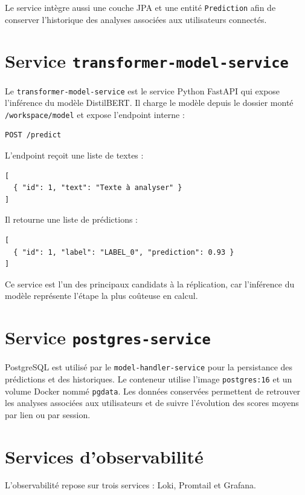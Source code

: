 ﻿\documentclass[12pt, a4paper]{report}
\begin{document}
Le service intègre aussi une couche JPA et une entité \texttt{Prediction} afin
de conserver l'historique des analyses associées aux utilisateurs connectés.

\section{Service \texttt{transformer-model-service}}

Le \texttt{transformer-model-service} est le service Python FastAPI qui expose
l'inférence du modèle DistilBERT. Il charge le modèle depuis le dossier monté
\texttt{/workspace/model} et expose l'endpoint interne :

\begin{verbatim}
POST /predict
\end{verbatim}

L'endpoint reçoit une liste de textes :

\begin{verbatim}
[
  { "id": 1, "text": "Texte à analyser" }
]
\end{verbatim}

Il retourne une liste de prédictions :

\begin{verbatim}
[
  { "id": 1, "label": "LABEL_0", "prediction": 0.93 }
]
\end{verbatim}

Ce service est l'un des principaux candidats à la réplication, car l'inférence du
modèle représente l'étape la plus coûteuse en calcul.

\section{Service \texttt{postgres-service}}

PostgreSQL est utilisé par le \texttt{model-handler-service} pour la persistance
des prédictions et des historiques. Le conteneur utilise l'image
\texttt{postgres:16} et un volume Docker nommé \texttt{pgdata}. Les données
conservées permettent de retrouver les analyses associées aux utilisateurs et de
suivre l'évolution des scores moyens par lien ou par session.

\section{Services d'observabilité}

L'observabilité repose sur trois services : Loki, Promtail et Grafana.
\end{document}

